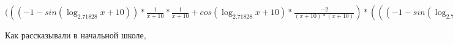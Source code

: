 \documentclass[12pt,a4paper,fleqn]{article}
\theoremstyle{definition}
\begin{document}
$((( -1  - sin(\log_{ 2.71828 }{ x  +  10 })) * \frac{ 1 }{ x  +  10 }
 * \frac{ 1 }{ x  +  10 }
 + cos(\log_{ 2.71828 }{ x  +  10 }) * \frac{ -2 }{( x  +  10 ) * ( x  +  10 )}
) * ((( -1  - sin(\log_{ 2.71828 }{ x  +  10 })) * \frac{ 1 }{ x  +  10 }
 * \frac{ 1 }{ x  +  10 }
 + cos(\log_{ 2.71828 }{ x  +  10 }) * \frac{ -1  -  1 }{( x  +  10 ) * ( x  +  10 )}
) * { 3 }^{sin(\log_{ 2.71828 }{ x  +  10 })} + cos(\log_{ 2.71828 }{ x  +  10 }) * \frac{ 1 }{ x  +  10 }
 * cos(\log_{ 2.71828 }{ x  +  10 }) * \frac{ 1 }{ x  +  10 }
 * { 3 }^{sin(\log_{ 2.71828 }{ x  +  10 })}) = (( -1  - sin(\log_{ 2.71828 }{ x  +  10 })) * \frac{ 1 }{ x  +  10 }
 * \frac{ 1 }{ x  +  10 }
 + cos(\log_{ 2.71828 }{ x  +  10 }) * \frac{ -2 }{( x  +  10 ) * ( x  +  10 )}
) * ((( -1  - sin(\log_{ 2.71828 }{ x  +  10 })) * \frac{ 1 }{ x  +  10 }
 * \frac{ 1 }{ x  +  10 }
 + cos(\log_{ 2.71828 }{ x  +  10 }) * \frac{ -1  -  1 }{( x  +  10 ) * ( x  +  10 )}
) * { 3 }^{sin(\log_{ 2.71828 }{ x  +  10 })} + cos(\log_{ 2.71828 }{ x  +  10 }) * \frac{ 1 }{ x  +  10 }
 * cos(\log_{ 2.71828 }{ x  +  10 }) * \frac{ 1 }{ x  +  10 }
 * { 3 }^{sin(\log_{ 2.71828 }{ x  +  10 })})$

Как рассказывали в начальной школе,
\end{document}
